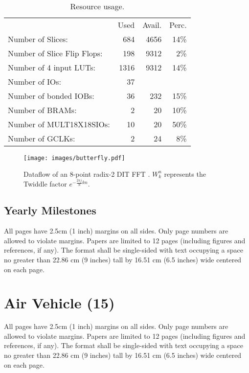 \documentclass[12pt, letterpaper]{article}
\begin{document}
\begin{table}[h]
\centering
\begin{tabular}{l  r  r  r}
                                       & Used  & Avail. & Perc. \\
  Number of Slices:                    &  684  & 4656  &  14\%  \\
  Number of Slice Flip Flops:          &  198  & 9312  &   2\%  \\
  Number of 4 input LUTs:              & 1316  & 9312  &  14\%  \\
  Number of IOs:                       &   37  &       &      \\
  Number of bonded IOBs:               &   36  &  232  &  15\%  \\
  Number of BRAMs:                     &    2  &   20  &  10\%  \\
  Number of MULT18X18SIOs:             &   10  &   20  &  50\%  \\
  Number of GCLKs:                     &    2  &   24  &   8\%  \\
\end{tabular}
\caption{Resource usage.}
\label{tab:usage}
\end{table}

\begin{figure}[h]
\centering
\texttt{[image: images/butterfly.pdf]}
\caption{Dataflow of an 8-point radix-2 DIT FFT \cite{bib:butterfly}. $W_k^n$ represents the Twiddle factor $e^{-\frac{2\pi j}{N}kn}$.} 
\label{fig:butterfly}
\end{figure}

\subsection{Yearly Milestones}
All pages have 2.5cm (1 inch) margins on all sides. Only page numbers are allowed to violate margins. Papers are limited to 12 pages (including figures and references, if any). The format shall be single-sided with text occupying a space no greater than 22.86 cm (9 inches) tall by 16.51 cm (6.5 inches) wide centered on each page.


\section{Air Vehicle (15)}
All pages have 2.5cm (1 inch) margins on all sides. Only page numbers are allowed to violate margins. Papers are limited to 12 pages (including figures and references, if any). The format shall be single-sided with text occupying a space no greater than 22.86 cm (9 inches) tall by 16.51 cm (6.5 inches) wide centered on each page.
\end{document}
